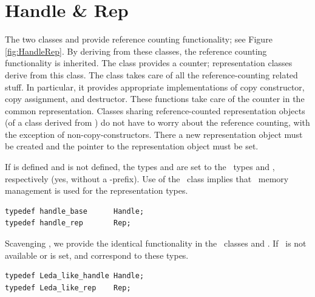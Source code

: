 \section{Handle \& Rep}
The two classes  and 
 provide reference counting
functionality; see Figure \ref{fig:HandleRep}. By deriving from these classes, 
the reference counting functionality is inherited. 
The class  provides a counter; representation classes 
derive from this class. 
The class  takes care of all the reference-counting
related stuff. In particular, it provides appropriate implementations of
copy constructor, copy assignment, and destructor. These functions
take care of the counter in the common representation. 
Classes sharing reference-counted 
representation objects (of a class derived from ) do not have to
worry about the reference counting, with the exception of non-copy-constructors.
There  a new representation object must be created and the pointer to the 
representation object must be set.

If %
is defined and %
 is not
defined, the types  and  are set to the \leda\ types
%
 and %
, respectively (yes, 
without a -prefix). Use of the \leda\ class  implies
that \leda\ memory management
is used for the representation types.

\begin{verbatim}
typedef handle_base      Handle;
typedef handle_rep       Rep;
\end{verbatim}

Scavenging \leda, we provide the identical functionality in the \cgal\ classes
%
 and %
. If \leda\ is not available or
 is set,  and  correspond to
these types.

\begin{verbatim}
typedef Leda_like_handle Handle;
typedef Leda_like_rep    Rep;
\end{verbatim}

